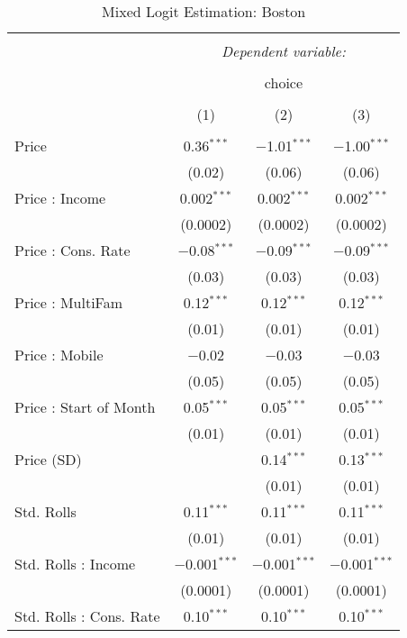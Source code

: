 
\begin{table}[!htbp] \centering 
  \caption{Mixed Logit Estimation: Boston} 
  \label{tab:mnlBostonRandCoef} 
\begin{tabular}{@{\extracolsep{5pt}}lccc} 
\\[-1.8ex]\hline 
\hline \\[-1.8ex] 
 & \multicolumn{3}{c}{\textit{Dependent variable:}} \\ 
\cline{2-4} 
\\[-1.8ex] & \multicolumn{3}{c}{choice} \\ 
\\[-1.8ex] & (1) & (2) & (3)\\ 
\hline \\[-1.8ex] 
 Price & 0.36$^{***}$ & $-$1.01$^{***}$ & $-$1.00$^{***}$ \\ 
  & (0.02) & (0.06) & (0.06) \\ 
  Price : Income & 0.002$^{***}$ & 0.002$^{***}$ & 0.002$^{***}$ \\ 
  & (0.0002) & (0.0002) & (0.0002) \\ 
  Price : Cons. Rate & $-$0.08$^{***}$ & $-$0.09$^{***}$ & $-$0.09$^{***}$ \\ 
  & (0.03) & (0.03) & (0.03) \\ 
  Price : MultiFam & 0.12$^{***}$ & 0.12$^{***}$ & 0.12$^{***}$ \\ 
  & (0.01) & (0.01) & (0.01) \\ 
  Price : Mobile & $-$0.02 & $-$0.03 & $-$0.03 \\ 
  & (0.05) & (0.05) & (0.05) \\ 
  Price : Start of Month & 0.05$^{***}$ & 0.05$^{***}$ & 0.05$^{***}$ \\ 
  & (0.01) & (0.01) & (0.01) \\ 
  Price (SD) &  & 0.14$^{***}$ & 0.13$^{***}$ \\ 
  &  & (0.01) & (0.01) \\ 
  Std. Rolls & 0.11$^{***}$ & 0.11$^{***}$ & 0.11$^{***}$ \\ 
  & (0.01) & (0.01) & (0.01) \\ 
  Std. Rolls : Income & $-$0.001$^{***}$ & $-$0.001$^{***}$ & $-$0.001$^{***}$ \\ 
  & (0.0001) & (0.0001) & (0.0001) \\ 
  Std. Rolls : Cons. Rate & 0.10$^{***}$ & 0.10$^{***}$ & 0.10$^{***}$ \\ 

\end{tabular}
\end{table}
